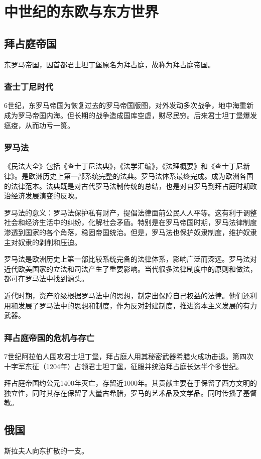 \section{中世纪的东欧与东方世界}
\subsection{拜占庭帝国}
东罗马帝国，因首都君士坦丁堡原名为拜占庭，故称为拜占庭帝国。

\subsubsection{查士丁尼时代}
6世纪，东罗马帝国为恢复过去的罗马帝国版图，对外发动多次战争，地中海重新成为罗马帝国内海。但长期的战争造成国库空虚，财尽民穷。后来君士坦丁堡爆发瘟疫，从而功亏一篑。

\subsubsection{罗马法}
《民法大全》包括《查士丁尼法典》，《法学汇编》，《法理概要》和《查士丁尼新律》。是欧洲历史上第一部系统完整的法典。罗马法体系最终完成。成为欧洲各国的法律范本。法典既是对古代罗马法制传统的总结，也是对自罗马到拜占庭时期政治经济发展演变的反映。

罗马法的意义：罗马法保护私有财产，提倡法律面前公民人人平等。这有利于调整社会和经济生活中的纠纷，化解社会矛盾。特别是在罗马帝国时期，罗马法律制度渗透到国家的各个角落，稳固帝国统治。但是，罗马法也保护奴隶制度，维护奴隶主对奴隶的剥削和压迫。

罗马法是欧洲历史上第一部比较系统完备的法律体系，影响广泛而深远。罗马法对近代欧美国家的立法和司法产生了重要影响。当代很多法律制度中的原则和做法，都可在罗马法中找到源头。

近代时期，资产阶级根据罗马法中的思想，制定出保障自己权益的法律。他们还利用和发展了罗马法中的思想和制度，作为反对封建制度，推进资本主义发展的有力武器。

\subsubsection{拜占庭帝国的危机与存亡}
7世纪阿拉伯人围攻君士坦丁堡，拜占庭人用其秘密武器希腊火成功击退。第四次十字军东征（1204年）占领君士坦丁堡，征服并统治拜占庭长达半个多世纪。

拜占庭帝国约公元1400年灭亡，存留近1000年。其贡献主要在于保留了西方文明的独立性，同时其存在保留了大量古希腊，罗马的艺术品及文学品。同时传播了基督教。


\subsection{俄国}
斯拉夫人向东扩散的一支。

